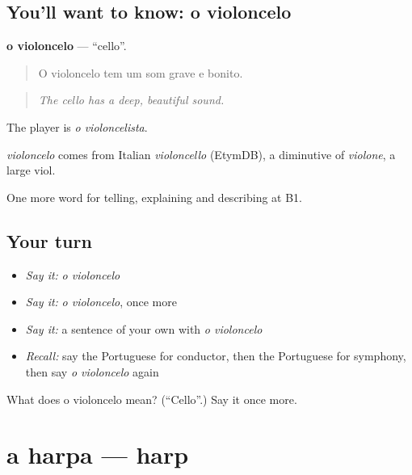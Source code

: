 \subsection*{You'll want to know: o violoncelo}
\textbf{o violoncelo} — \textquotedblleft{}cello\textquotedblright{}.

\begin{quote}
O violoncelo tem um som grave e bonito.
\end{quote}

\begin{quote}
\emph{The cello has a deep, beautiful sound.}
\end{quote}

The player is \emph{o violoncelista}.

\begin{cousinweb}
\emph{violoncelo} comes from Italian \emph{violoncello} (EtymDB), a diminutive of \emph{violone}, a large viol.
\end{cousinweb}

\begin{grammarlens}[title={What you've built}]
One more word for telling, explaining and describing at B1.
\end{grammarlens}

\subsection*{Your turn}
\begin{itemize}
\raggedright
  \item \emph{Say it:} \emph{o violoncelo}
  \item \emph{Say it:} \emph{o violoncelo}, once more
  \item \emph{Say it:} a sentence of your own with \emph{o violoncelo}
  \item \emph{Recall:} say the Portuguese for conductor, then the Portuguese for symphony, then say \emph{o violoncelo} again
\end{itemize}

\begin{tcolorbox}[breakable,colback=teal!4,colframe=teal!35!black,title={Before you move on}]
What does o violoncelo mean? (\textquotedblleft{}Cello\textquotedblright{}.) Say it once more.
\end{tcolorbox}
\section[a harpa]{a harpa — harp}

